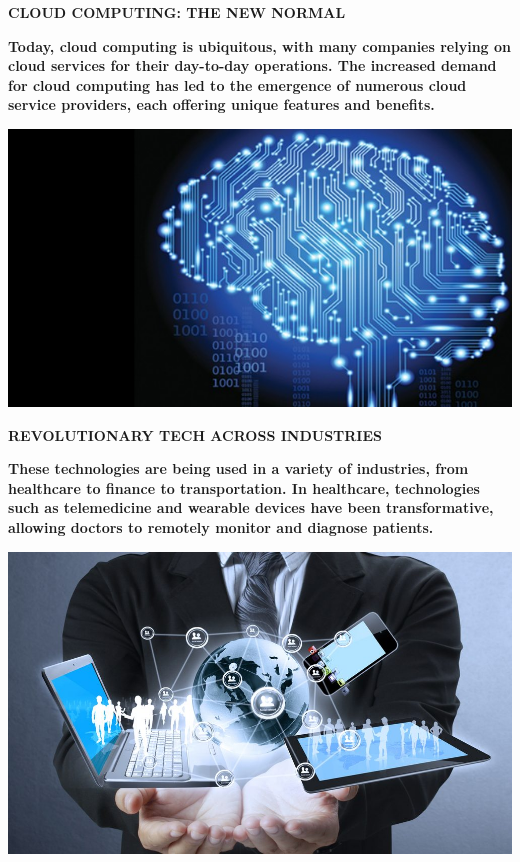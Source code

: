\documentclass[pdf,aspectratio=169]{beamer}
\begin{document}
\begin{frame}{\textbf{CLOUD COMPUTING: THE NEW NORMAL}}
	\begin{minipage}{0.6\textwidth}
		\textbf{\text Today, cloud computing is ubiquitous, with many companies relying on cloud services for their day-to-day operations. The increased demand for cloud computing has led to the emergence of numerous cloud service providers, each offering unique features and benefits.}
	\end{minipage}
	\hfill
	\begin{minipage}{0.3\textwidth}
		\centering
		\includegraphics[width=\textwidth]{figs/IMG6}
	\end{minipage}
\end{frame}

\begin{frame}{\textbf{REVOLUTIONARY TECH ACROSS INDUSTRIES}}
	\begin{minipage}{0.6\textwidth}
		\textbf{\text These technologies are being used in a variety of industries, from healthcare to finance to transportation. In healthcare, technologies such as telemedicine and wearable devices have been transformative, allowing doctors to remotely monitor and diagnose patients.}
	\end{minipage}
	\hfill
	\begin{minipage}{0.3\textwidth}
		\centering
		\includegraphics[width=\textwidth]{figs/IMG7}
	\end{minipage}
\end{frame}
\end{document}
